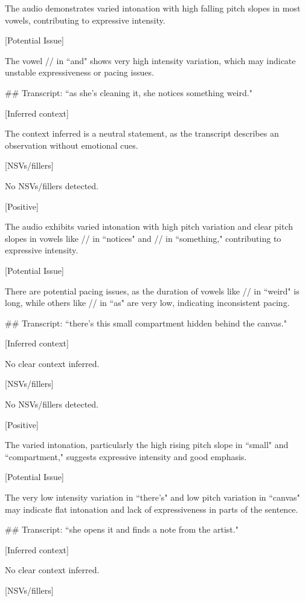 \begin{tcolorbox}[blue_box, title = {{Audio Sample 3 : Ground-truth Human-likeness Rating = 4.0}}]
The audio demonstrates varied intonation with high falling pitch slopes in most vowels, contributing to expressive intensity.


[Potential Issue]  

The vowel // in ``and" shows very high intensity variation, which may indicate unstable expressiveness or pacing issues.


\#\# Transcript: ``as she's cleaning it, she notices something weird."

[Inferred context]  

The context inferred is a neutral statement, as the transcript describes an observation without emotional cues.


[NSVs/fillers]  

No NSVs/fillers detected.


[Positive]  

The audio exhibits varied intonation with high pitch variation and clear pitch slopes in vowels like // in ``notices" and // in ``something," contributing to expressive intensity.


[Potential Issue]  

There are potential pacing issues, as the duration of vowels like // in ``weird" is long, while others like // in ``as" are very low, indicating inconsistent pacing.


\#\# Transcript: ``there's this small compartment hidden behind the canvas."

[Inferred context]  

No clear context inferred.


[NSVs/fillers]  

No NSVs/fillers detected.


[Positive]  

The varied intonation, particularly the high rising pitch slope in ``small" and ``compartment," suggests expressive intensity and good emphasis.


[Potential Issue]  

The very low intensity variation in ``there's" and low pitch variation in ``canvas" may indicate flat intonation and lack of expressiveness in parts of the sentence.


\#\# Transcript: ``she opens it and finds a note from the artist."

[Inferred context]  

No clear context inferred.


[NSVs/fillers]  


\end{tcolorbox}
